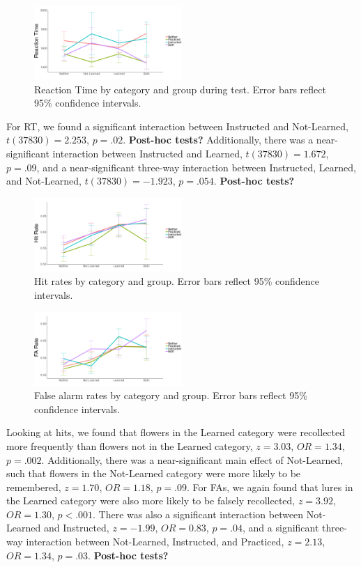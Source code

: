\documentclass[twocolumn]{svjour3}          %
\begin{document}
\begin{figure}
  \includegraphics[width=0.5\textwidth]{E6_RT.png}
  \caption{Reaction Time by category and group during test. Error bars
    reflect 95\% confidence intervals.}
  \label{fig:rt}
\end{figure}

For RT, we found a significant interaction between Instructed and
Not-Learned, $t(37830) = 2.253$, $p = .02$. \textbf{Post-hoc tests?}
Additionally, there was a near-significant interaction between
Instructed and Learned, $t(37830) = 1.672$, $p = .09$, and a
near-significant three-way interaction between Instructed, Learned,
and Not-Learned, $t(37830) = -1.923$, $p = .054$. \textbf{Post-hoc
  tests?}

\begin{figure}
  \includegraphics[width=0.5\textwidth]{E6_hits.png}
  \caption{Hit rates by category and group. Error bars reflect 95\%
    confidence intervals.}
  \label{fig:hits}
\end{figure}
\begin{figure}
  \includegraphics[width=0.5\textwidth]{E6_FAs.png}
  \caption{False alarm rates by category and group. Error bars reflect
    95\% confidence intervals.}
  \label{fig:fas}
\end{figure}


Looking at hits, we found that flowers in the Learned category were
recollected more frequently than flowers not in the Learned category,
$z = 3.03$, $OR = 1.34$, $p = .002$. Additionally, there was a
near-significant main effect of Not-Learned, such that flowers in the
Not-Learned category were more likely to be remembered, $z = 1.70$,
$OR = 1.18$, $p = .09$. For FAs, we again found that lures in the
Learned category were also more likely to be falsely recollected, $z =
3.92$, $OR = 1.30$, $p < .001$. There was also a significant
interaction between Not-Learned and Instructed, $z = -1.99$, $OR =
0.83$, $p = .04$, and a significant three-way interaction between
Not-Learned, Instructed, and Practiced, $z = 2.13$, $OR = 1.34$, $p =
.03$. \textbf{Post-hoc tests?}
\end{document}
